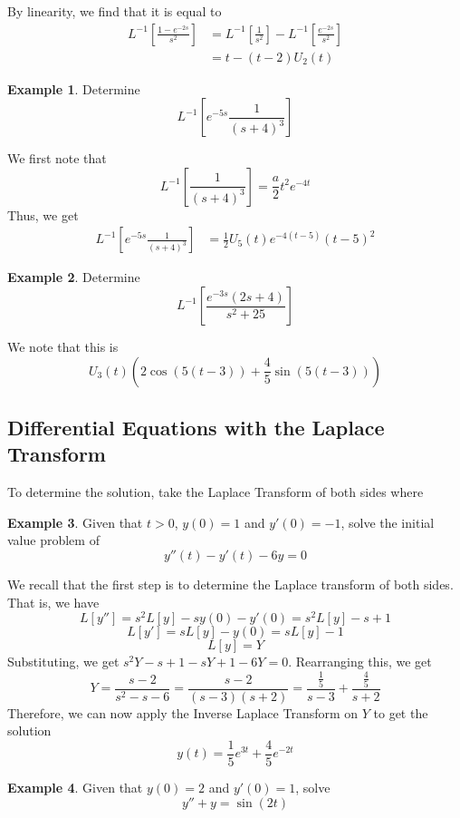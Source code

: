 \documentclass[11pt]{article}
\theoremstyle{plain} %
\theoremstyle{definition}
\theoremstyle{example}
\newtheorem*{example}{Example}
\theoremstyle{remark}
\begin{document}
By linearity, we find that it is equal to 
\begin{align*}
 L^{-1}\left[\frac{1-e^{-2s}}{s^2}\right]&= L^{-1} \left[\frac{1}{s^2}\right] - L^{-1}\left[\frac{e^{-2s}}{s^2}\right] \\
&= t-(t-2)U_2(t)
\end{align*}

\begin{example}
Determine $$L^{-1}\left[e^{-5s}\frac{1}{(s+4)^3}\right]$$
\end{example}
We first note that $$L^{-1}\left[\frac{1}{(s+4)^3}\right] = \frac{a}{2}t^2e^{-4t}$$ Thus, we get
\begin{align*}
L^{-1}\left[e^{-5s}\frac{1}{(s+4)^3}\right] &= \frac{1}{2}U_5(t)e^{-4(t-5)}(t-5)^2
\end{align*}




\begin{example}
Determine $$L^{-1}\left[\frac{e^{-3s}(2s+4)}{s^2+25}\right]$$
\end{example}

We note that this is $$U_3(t)\left(2\cos(5(t-3)) + \frac{4}{5}\sin(5(t-3))\right)$$

\subsection{Differential Equations with the Laplace Transform}

To determine the solution, take the Laplace Transform of both sides where 

\begin{example}
Given that $t>0$, $y(0) = 1$ and $y'(0) = -1$, solve the initial value problem of $$y''(t) - y'(t) -6y = 0$$
\end{example}

We recall that the first step is to determine the Laplace transform of both sides. That is, we have $$L[y''] = s^2L[y] -sy(0) - y'(0) = s^2L[y]-s+1$$
$$L[y'] = sL[y] - y(0) = sL[y] - 1$$
$$L[y] = Y$$
Substituting, we get $s^2Y - s + 1 -sY + 1 -6Y = 0$. Rearranging this, we get $$Y = \frac{s-2}{s^2-s-6} = \frac{s-2}{(s-3)(s+2)}= \frac{\frac{1}{5}}{s-3} + \frac{\frac{4}{5}}{s+2}$$ Therefore, we can now apply the Inverse Laplace Transform on $Y$ to get the solution $$y(t) = \frac{1}{5}e^{3t}+\frac{4}{5}e^{-2t}$$

\begin{example}
Given that $y(0) = 2$ and $y'(0) = 1$, solve $$y'' + y = \sin(2t)$$
\end{example}
\end{document}
